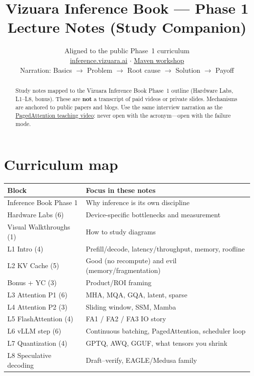 \documentclass[11pt,a4paper]{article}
\title{Vizuara Inference Book --- Phase 1\\
\large Lecture Notes (Study Companion)}
\author{Aligned to the public Phase~1 curriculum\\
\href{https://inference.vizuara.ai/}{inference.vizuara.ai} $\cdot$
\href{https://maven.com/vizuara/inference-workshop}{Maven workshop}\\[0.4em]
Narration: Basics $\rightarrow$ Problem $\rightarrow$ Root cause $\rightarrow$ Solution $\rightarrow$ Payoff}
\date{}
\begin{document}
\maketitle

\begin{abstract}
Study notes mapped to the Vizuara Inference Book Phase~1 outline
(Hardware Labs, L1--L8, bonus).
These are \textbf{not} a transcript of paid videos or private slides.
Mechanisms are anchored to public papers and blogs.
Use the same interview narration as the
\href{https://www.youtube.com/watch?v=-AB6m0Spo6c}{PagedAttention teaching video}:
never open with the acronym---open with the failure mode.
\end{abstract}

\tableofcontents
\clearpage

\section{Curriculum map}
\begin{table}[ht]
\centering\small
\begin{tabularx}{\textwidth}{@{}lY@{}}
\toprule
\textbf{Block} & \textbf{Focus in these notes} \\
\midrule
Inference Book Phase 1 & Why inference is its own discipline \\
Hardware Labs (6) & Device-specific bottlenecks and measurement \\
Visual Walkthroughs (1) & How to study diagrams \\
L1 Intro (4) & Prefill/decode, latency/throughput, memory, roofline \\
L2 KV Cache (5) & Good (no recompute) and evil (memory/fragmentation) \\
Bonus + YC (3) & Product/ROI framing \\
L3 Attention P1 (6) & MHA, MQA, GQA, latent, sparse \\
L4 Attention P2 (3) & Sliding window, SSM, Mamba \\
L5 FlashAttention (4) & FA1 / FA2 / FA3 IO story \\
L6 vLLM step (6) & Continuous batching, PagedAttention, scheduler loop \\
L7 Quantization (4) & GPTQ, AWQ, GGUF, what tensors you shrink \\
L8 Speculative decoding & Draft--verify, EAGLE/Medusa family \\
\bottomrule
\end{tabularx}
\end{table}
\end{document}
